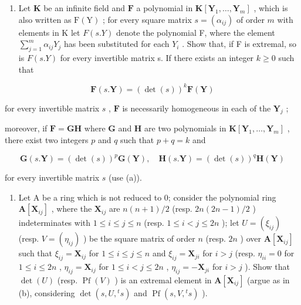 \begin{enumerate}
\def\labelenumi{(\alph{enumi})}
\setcounter{enumi}{1}
\tightlist
\item
  Let \(\mathbf{K}\) be an infinite field and \(\mathbf{F}\) a polynomial in \(\mathbf{K}[\mathbf{Y}_1,\dots ,\mathbf{Y}_m]\) , which is also written as \(\mathrm{F(Y)}\) ; for every square matrix \(s = (\alpha_{ij})\) of order \(m\) with elements in K let \(F(s.Y)\) denote the polynomial F, where the element \(\sum_{j=1}^{m}\alpha_{ij}Y_{j}\) has been substituted for each \(Y_{i}\) . Show that, if F is extremal, so is \(F(s.Y)\) for every invertible matrix s. If there exists an integer \(k\geqslant0\) such that
\end{enumerate}

\[
\mathbf {F} (s. \mathbf {Y}) = (\det (s)) ^ {k} \mathbf {F} (\mathbf {Y})
\]

for every invertible matrix \(s\) , \(\mathbf{F}\) is necessarily homogeneous in each of the \(\mathbf{Y}_j\) ;

moreover, if \(\mathbf{F} = \mathbf{GH}\) where \(\mathbf{G}\) and \(\mathbf{H}\) are two polynomials in \(\mathbf{K}[\mathbf{Y}_1,\dots ,\mathbf{Y}_m]\) , there exist two integers \(p\) and \(q\) such that \(p + q = k\) and

\[
\mathbf {G} (s. \mathbf {Y}) = (\det (s)) ^ {p} \mathbf {G} (\mathbf {Y}), \quad \mathbf {H} (s. \mathbf {Y}) = (\det (s)) ^ {q} \mathbf {H} (\mathbf {Y})
\]

for every invertible matrix \(s\) (use (a)).

\begin{enumerate}
\def\labelenumi{(\alph{enumi})}
\setcounter{enumi}{2}
\tightlist
\item
  Let A be a ring which is not reduced to 0; consider the polynomial ring \(\mathbf{A}[\mathbf{X}_{ij}]\) , where the \(\mathbf{X}_{ij}\) are \(n(n + 1)/2\) (resp. \(2n(2n - 1)/2\) ) indeterminates with \(1 \leqslant i \leqslant j \leqslant n\) (resp. \(1 \leqslant i < j \leqslant 2n\) ); let \(U = (\xi_{ij})\) (resp. \(V = (\eta_{ij})\) ) be the square matrix of order \(n\) (resp. \(2n\) ) over \(\mathbf{A}[\mathbf{X}_{ij}]\) such that \(\xi_{ij} = \mathbf{X}_{ij}\) for \(1 \leqslant i \leqslant j \leqslant n\) and \(\xi_{ij} = \mathbf{X}_{ji}\) for \(i > j\) (resp. \(\eta_{ii} = 0\) for \(1 \leqslant i \leqslant 2n\) , \(\eta_{ij} = \mathbf{X}_{ij}\) for \(1 \leqslant i < j \leqslant 2n\) , \(\eta_{ij} = -\mathbf{X}_{ji}\) for \(i > j\) ). Show that \(\det(U)\) (resp. \(\operatorname{Pf}(V)\) ) is an extremal element in \(\mathbf{A}[\mathbf{X}_{ij}]\) (argue as in (b), considering \(\det(s, U, {}^ts)\) and \(\operatorname{Pf}(s, V, {}^ts)\) ).
\end{enumerate}

